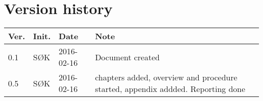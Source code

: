 \chapter*{Version history}
\label{app:rev_his}


\begin{tabular}{b{1cm} b{1cm} b{2cm} b{8cm}}
    \textbf{Ver.} & \textbf{Init.} & \textbf{Date} & \textbf{Note} \\
    \hline
    0.1 & SØK & 2016-02-16 & Document created \\
    0.5 & SØK & 2016-02-16 & chapters added, overview and procedure started, appendix addded. Reporting done \\
\end{tabular}
